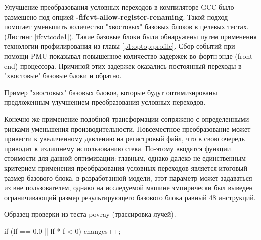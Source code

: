 Улучшение преобразования условных переходов в компиляторе GCC было размещено под опцией \mbox{\textbf{-fifcvt-allow-register-renaming}}. Такой подход помогает уменьшить количество "хвостовых" базовых блоков в целевых тестах. (Листинг \ref{ifcvtcode1}). Такие базовые блоки были обнаружены путем применения технологии профилирования из главы \ref{p1:optop:profile}. Сбор событий при помощи PMU показывал повышенное количество задержек во фортн-энде (front-end) процессора. Причиной этих задержек оказались постоянный переходы в "хвостовые" базовые блоки и обратно.


\begin{ListingEnv}[!h]
	\captiondelim{ } %
		\caption{Пример "хвостовых" базовых блоков, которые будут оптимизированы предложенным улучшением преобразования условных переходов.}
	\label{ifcvtcode1}
\end{ListingEnv}

Конечно же применение подобной трансформации сопряжено с определенными рисками уменьшения производительности. Повсеместное преобразование может привести к увеличенному давлению на регистровый файл, что в свою очередь приводит к излишнему использованию стека. По-этому вводятся функции стоимости для данной оптимизации: главным, однако далеко не единственным критерием применения преобразования условных переходов является итоговый размер базового блока, в  разработанной модели, этот параметр может задаваться из вне пользователем, однако на исследуемой машине эмпирически был выведен  ограничивающий размер  результирующего базового блока равный 48 инструкций.
\begin{ListingEnv}[!h]
	\captiondelim{ } %
	\caption{Образец проверки из теста povray (трассировка лучей).}
	\label{ifcvtcode2}
	\begin{Verb}
		if (lf == 0.0 || lf * f < 0)
		{
			changes++;
		} 
	\end{Verb}
\end{ListingEnv}


